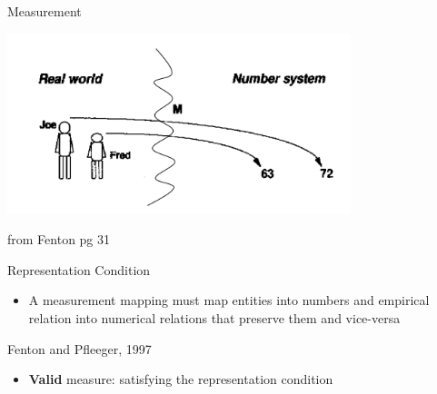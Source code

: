 \documentclass{beamer}
\begin{document}
\begin{frame}{\centerline{Measurement}}
\begin{center}
\includegraphics[width=100mm]{A2022.IDSEPC.SperimentazioneDeduzione/img-img09.png}
\newline
\end{center}

\begin{small}
\begin{center}
from Fenton pg 31
\end{center}
\end{small}

\end{frame}

\begin{frame}{\centerline{Representation Condition}}

\begin{itemize}
\item  A measurement mapping must map entities into numbers and empirical relation into numerical relations that preserve them and vice-versa
\end{itemize}
\begin{flushright}
Fenton and Pfleeger, 1997
\end{flushright}
\begin{itemize}
\item  \textbf{Valid} measure: satisfying the representation condition
\end{itemize}

\end{frame}
\end{document}
